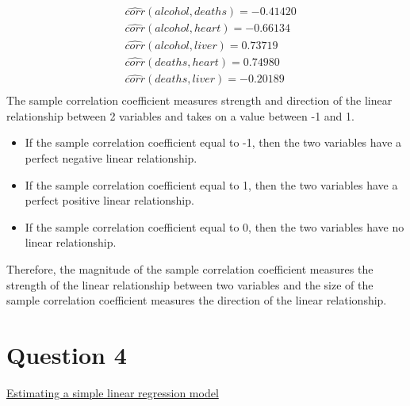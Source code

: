 \documentclass[12pt]{report}
\begin{document}
		\begin{align*}
			&\widehat{corr}(alcohol,deaths) = -0.41420 \\
			&\widehat{corr}(alcohol,heart) = -0.66134 \\
			&\widehat{corr}(alcohol,liver) = 0.73719 \\
			&\widehat{corr}(deaths,heart) = 0.74980 \\
			&\widehat{corr}(deaths,liver) = -0.20189 \\
		\end{align*}
		\noindent The sample correlation coefficient measures strength and direction of the linear relationship between 2 variables and takes on a value between -1 and 1. \begin{itemize}
			\item If the sample correlation coefficient equal to -1, then the two variables have a perfect negative linear relationship.
			\item If the sample correlation coefficient equal to 1, then the two variables have a perfect positive linear relationship.
			\item If the sample correlation coefficient equal to 0, then the two variables have no linear relationship.
		\end{itemize} Therefore, the magnitude of the sample correlation coefficient measures the strength of the linear relationship between two variables and the size of the sample correlation coefficient measures the direction of the linear relationship.
	\newpage	
	\section*{Question 4}
	\underline{Estimating a simple linear regression model}
		
\end{document}
